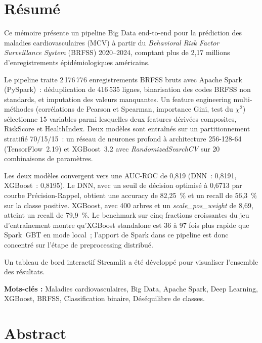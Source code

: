 \chapter*{Résumé}

Ce mémoire présente un pipeline Big Data end-to-end pour la prédiction des maladies cardiovasculaires (MCV) à partir du \textit{Behavioral Risk Factor Surveillance System} (BRFSS) 2020--2024, comptant plus de 2,17 millions d'enregistrements épidémiologiques américains.

Le pipeline traite 2\,176\,776 enregistrements BRFSS bruts avec Apache Spark (PySpark)~: déduplication de 416\,535 lignes, binarisation des codes BRFSS non standards, et imputation des valeurs manquantes. Un feature engineering multi-méthodes (corrélations de Pearson et Spearman, importance Gini, test du $\chi^2$) sélectionne 15 variables parmi lesquelles deux features dérivées composites, RiskScore et HealthIndex. Deux modèles sont entraînés sur un partitionnement stratifié 70/15/15~: un réseau de neurones profond à architecture 256-128-64 (TensorFlow~2.19) et XGBoost~3.2 avec \textit{RandomizedSearchCV} sur 20 combinaisons de paramètres.

Les deux modèles convergent vers une AUC-ROC de 0,819 (DNN~: 0,8191, XGBoost~: 0,8195). Le DNN, avec un seuil de décision optimisé à 0,6713 par courbe Précision-Rappel, obtient une accuracy de 82,25~\% et un recall de 56,3~\% sur la classe positive. XGBoost, avec 400 arbres et un \textit{scale\_pos\_weight} de 8,69, atteint un recall de 79,9~\%. Le benchmark sur cinq fractions croissantes du jeu d'entraînement montre qu'XGBoost standalone est 36 à 97 fois plus rapide que Spark~GBT en mode local~; l'apport de Spark dans ce pipeline est donc concentré sur l'étape de preprocessing distribué.

Un tableau de bord interactif Streamlit a été développé pour visualiser l'ensemble des résultats.

\vspace{0.4cm}
\textbf{Mots-clés :} Maladies cardiovasculaires, Big Data, Apache Spark, Deep Learning, XGBoost, BRFSS, Classification binaire, Déséquilibre de classes.

\newpage

\chapter*{Abstract}

